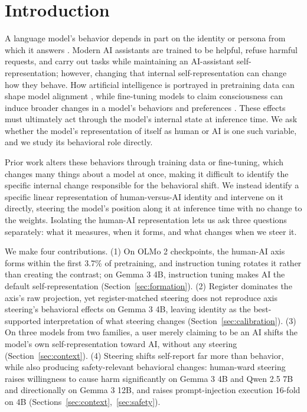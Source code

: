 \section{Introduction}
\label{sec:intro}

A language model's behavior depends in part on the identity or persona from
which it answers \citep{shanahan2023roleplay}. Modern AI assistants are
trained to be helpful, refuse harmful requests, and carry out tasks while
maintaining an AI-assistant self-representation; however, changing that internal
self-representation can change how they behave. How artificial
intelligence is portrayed in pretraining data can shape model alignment
\citep{tice2026alignment}, while fine-tuning models to claim consciousness can
induce broader changes in a model's behaviors and preferences
\citep{chua2026consciousness}. These effects must ultimately act through the
model's internal state at inference time. We ask whether the model's
representation of itself as human or AI is one such variable, and we study
its behavioral role directly.

Prior work alters these behaviors through training data or fine-tuning, which
changes many things about a model at once, making it difficult to identify
the specific internal change responsible for the behavioral shift. We instead
identify a specific linear representation of human-versus-AI identity and
intervene on it directly, steering the model's position along it at inference
time with no change to the weights. Isolating the human-AI
representation lets us ask three questions separately: what it measures, when
it forms, and what changes when we steer it.

We make four contributions. (1) On OLMo 2 checkpoints, the human-AI axis forms
within the first 3.7\% of pretraining, and instruction tuning rotates it
rather than creating the contrast; on Gemma 3 4B, instruction tuning makes AI
the default self-representation (Section~\ref{sec:formation}). (2)
Register dominates the axis's raw projection, yet register-matched steering
does not reproduce axis steering's behavioral effects on Gemma 3 4B,
leaving identity as the best-supported interpretation of what steering changes
(Section~\ref{sec:calibration}). (3) On three models from two families, a
user merely claiming to be an AI shifts the model's own self-representation
toward AI, without any steering (Section~\ref{sec:context}). (4) Steering
shifts self-report far more than behavior, while also producing
safety-relevant behavioral changes: human-ward steering raises willingness to
cause harm significantly on Gemma 3 4B and Qwen 2.5 7B and directionally on
Gemma 3 12B, and raises prompt-injection execution 16-fold on 4B
(Sections~\ref{sec:context},~\ref{sec:safety}).
